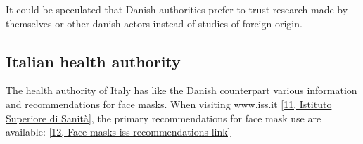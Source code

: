 It could be speculated that Danish authorities prefer to trust research made by themselves or other danish actors instead of studies of foreign origin.


\subsection*{Italian health authority}
The health authority of Italy has like the Danish counterpart various information and recommendations for face masks. 
When visiting www.iss.it \href{https://www.iss.it}{[11, Istituto Superiore di Sanità]}, the primary recommendations for face mask use are available:
\href{https://www.iss.it/web/iss-en/home?p_p_id=com_liferay_portal_search_web_portlet_SearchPortlet&p_p_lifecycle=0&p_p_state=maximized&p_p_mode=view&_com_liferay_portal_search_web_portlet_SearchPortlet_mvcPath=%2Fview_content.jsp&_com_liferay_portal_search_web_portlet_SearchPortlet_assetEntryId=5537109&_com_liferay_portal_search_web_portlet_SearchPortlet_type=content&p_l_back_url=https%3A%2F%2Fwww.iss.it%2Fweb%2Fiss-en%2Fhome%3Fp_p_id%3Dcom_liferay_portal_search_web_portlet_SearchPortlet%26p_p_lifecycle%3D0%26p_p_state%3Dmaximized%26p_p_mode%3Dview%26_com_liferay_portal_search_web_portlet_SearchPortlet_redirect%3Dhttps%253A%252F%252Fwww.iss.it%252Fweb%252Fiss-en%252Fhome%253Fp_p_id%253Dcom_liferay_portal_search_web_portlet_SearchPortlet%2526p_p_lifecycle%253D0%2526p_p_state%253Dnormal%2526p_p_mode%253Dview%26_com_liferay_portal_search_web_portlet_SearchPortlet_mvcPath%3D%252Fsearch.jsp%26_com_liferay_portal_search_web_portlet_SearchPortlet_keywords%3DFace%2Bmasks%26_com_liferay_portal_search_web_portlet_SearchPortlet_formDate%3D1660814304777%26_com_liferay_portal_search_web_portlet_SearchPortlet_scope%3Dthis-site}{[12, Face masks iss recommendations link]}

